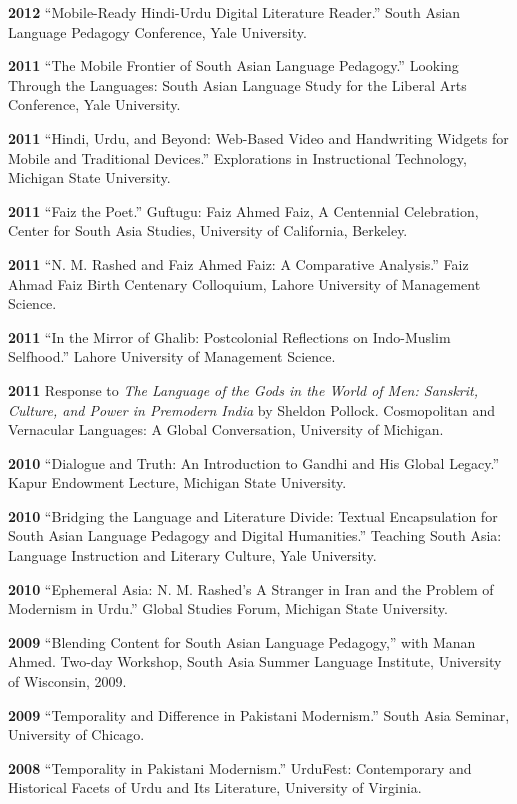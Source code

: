 \documentclass[letterpaper,12pt]{article}
\begin{document}
\textbf{2012}
“Mobile-Ready Hindi-Urdu Digital Literature Reader.”
South Asian Language Pedagogy Conference, Yale University.

\textbf{2011}
“The Mobile Frontier of South Asian Language Pedagogy.”
Looking Through the Languages:
South Asian Language Study for the Liberal Arts Conference,
Yale University.

\textbf{2011}
“Hindi, Urdu, and Beyond:
Web-Based Video and Handwriting Widgets for Mobile and Traditional Devices.”
Explorations in Instructional Technology, Michigan State University.

\textbf{2011}
“Faiz the Poet.”
Guftugu: Faiz Ahmed Faiz, A Centennial Celebration,
Center for South Asia Studies, University of California, Berkeley.

\textbf{2011}
“N. M. Rashed and Faiz Ahmed Faiz: A Comparative Analysis.”
Faiz Ahmad Faiz Birth Centenary Colloquium,
Lahore University of Management Science.

\textbf{2011}
“In the Mirror of Ghalib: Postcolonial Reflections on Indo-Muslim Selfhood.”
Lahore University of Management Science.

\textbf{2011}
Response to \emph{The Language of the Gods in the World of Men:
Sanskrit, Culture, and Power in Premodern India} by Sheldon Pollock.
Cosmopolitan and Vernacular Languages: A Global Conversation, University of Michigan.

\textbf{2010}
“Dialogue and Truth: An Introduction to Gandhi and His Global Legacy.”
Kapur Endowment Lecture, Michigan State University.

\textbf{2010}
“Bridging the Language and Literature Divide:
Textual Encapsulation for South Asian Language Pedagogy and Digital Humanities.”
Teaching South Asia: Language Instruction and Literary Culture, Yale University.

\textbf{2010}
“Ephemeral Asia:
N. M. Rashed’s A Stranger in Iran and the Problem of Modernism in Urdu.”
Global Studies Forum, Michigan State University.

\textbf{2009}
“Blending Content for South Asian Language Pedagogy,”
with Manan Ahmed.
Two-day Workshop, South Asia Summer Language Institute,
University of Wisconsin, 2009.

\textbf{2009}
“Temporality and Difference in Pakistani Modernism.”
South Asia Seminar, University of Chicago.

\textbf{2008}
“Temporality in Pakistani Modernism.”
UrduFest: Contemporary and Historical Facets of Urdu and Its Literature,
University of Virginia.
\end{document}
